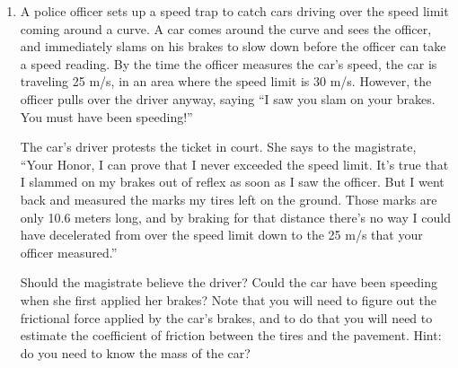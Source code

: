 \documentclass[12pt]{article}
\begin{document}
\begin{enumerate}
\newpage

  \item{A police officer sets up a speed trap to catch cars driving over the speed limit coming around a curve. A car comes around the curve and sees the officer, and immediately slams on his brakes to slow down before the officer can take a speed reading. 
By the time the officer measures the car's speed, the car is traveling 25 m/s, in an area where the speed limit is 30 m/s. However, the officer pulls over the driver anyway, saying ``I saw you slam on your brakes. You must have been speeding!''

The car's driver protests the ticket in court. She says to the magistrate, ``Your Honor, I can prove that I never exceeded the speed limit. It's true that I slammed on my brakes out of reflex as soon as I saw the officer. But I went back and measured the marks
my tires left on the ground. Those marks are only 10.6 meters long, and by braking for that distance there's no way I could have decelerated from over the speed limit down to the 25 m/s that your officer measured.''

Should the magistrate believe the driver? Could the car have been speeding when she first applied her brakes? Note that you will need to figure out the frictional force applied by the car's brakes, and to do that you will need to estimate the coefficient of 
friction between the tires and the pavement. Hint: do you need to know the mass of the car?}

 \end{enumerate}
 
\end{document}
